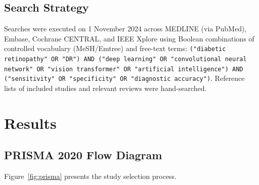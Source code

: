\documentclass[11pt,a4paper]{article}
\begin{document}
\subsection{Search Strategy}

Searches were executed on 1 November 2024 across MEDLINE (via PubMed),
Embase, Cochrane CENTRAL, and IEEE Xplore using Boolean combinations of controlled
vocabulary (MeSH/Emtree) and free-text terms:
\texttt{("diabetic retinopathy" OR "DR") AND ("deep learning" OR "convolutional neural
network" OR "vision transformer" OR "artificial intelligence") AND
("sensitivity" OR "specificity" OR "diagnostic accuracy")}.
Reference lists of included studies and relevant reviews were hand-searched.

\section{Results}

\subsection{PRISMA 2020 Flow Diagram}

Figure~\ref{fig:prisma} presents the study selection process.
\end{document}

